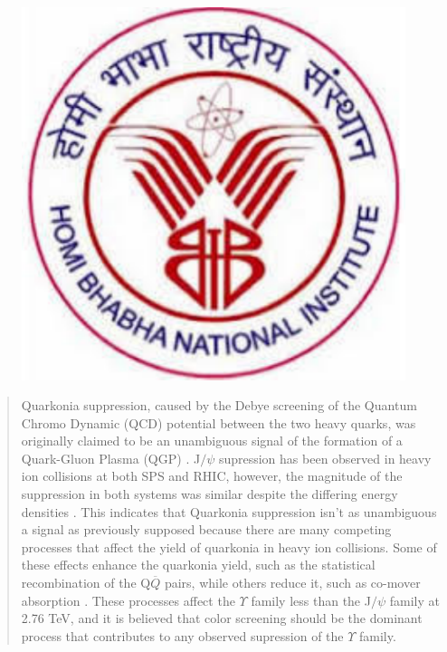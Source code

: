 
    \begin{figure}
     \includegraphics[width=\smallfigwidth]{HBNI}
  \caption[]{}
\end{figure}


\begin{abstract}%

Quarkonia suppression, caused by the Debye screening of the Quantum Chromo
Dynamic (QCD) potential between the two heavy quarks, was originally claimed to
be an unambiguous signal of the formation of a Quark-Gluon Plasma (QGP) \cite{SATZ}. 
J$/\psi$ supression has been observed in heavy ion collisions at both SPS and RHIC, however,
the magnitude of the suppression in both systems was similar despite the differing
energy densities \cite{NA50}. This indicates that Quarkonia suppression isn't as unambiguous
a signal as previously supposed because there are many competing processes that
affect the yield of quarkonia in heavy ion collisions. Some of these effects enhance
the quarkonia yield, such as the statistical recombination of the Q$\overline{Q}$ pairs, while
others reduce it, such as co-mover absorption \cite{Lin}. These processes affect the $\Upsilon$ 
family less than the J$/\psi$  family at 2.76 TeV, and it is believed that color screening should
be the dominant process that contributes to any observed supression of the $\Upsilon$ family. 
\end{abstract}



